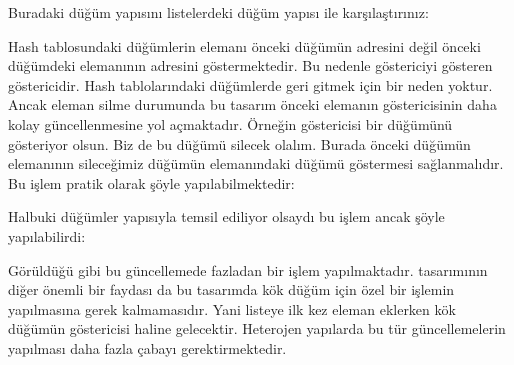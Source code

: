 \documentclass[a4paper,10pt,turkish]{sphinxmanual}
\begin{document}
\sphinxAtStartPar
Buradaki düğüm yapısını listelerdeki düğüm yapısı ile karşılaştırınız:

\begin{sphinxVerbatim}[commandchars=\\\{\}]
\end{sphinxVerbatim}

\sphinxAtStartPar
Hash tablosundaki düğümlerin  elemanı önceki düğümün adresini değil önceki
düğümdeki  elemanının adresini göstermektedir. Bu nedenle  göstericiyi
gösteren göstericidir. Hash tablolarındaki düğümlerde geri gitmek için bir neden yoktur.
Ancak eleman silme durumunda bu tasarım önceki elemanın  göstericisinin daha kolay
güncellenmesine yol açmaktadır. Örneğin  göstericisi bir  düğümünü
gösteriyor olsun. Biz de bu düğümü silecek olalım. Burada önceki düğümün  elemanının
sileceğimiz düğümün  elemanındaki düğümü göstermesi sağlanmalıdır. Bu işlem pratik
olarak şöyle yapılabilmektedir:

\begin{sphinxVerbatim}[commandchars=\\\{\}]
\end{sphinxVerbatim}

\sphinxAtStartPar
Halbuki düğümler  yapısıyla temsil ediliyor olsaydı bu işlem ancak şöyle
yapılabilirdi:

\begin{sphinxVerbatim}[commandchars=\\\{\}]
\end{sphinxVerbatim}

\sphinxAtStartPar
Görüldüğü gibi bu güncellemede fazladan bir işlem yapılmaktadır.  tasarımının
diğer önemli bir faydası da bu tasarımda kök düğüm için özel bir işlemin yapılmasına gerek
kalmamasıdır. Yani listeye ilk kez eleman eklerken  kök düğümün 
göstericisi haline gelecektir. Heterojen yapılarda bu tür güncellemelerin yapılması daha
fazla çabayı gerektirmektedir.
\end{document}
